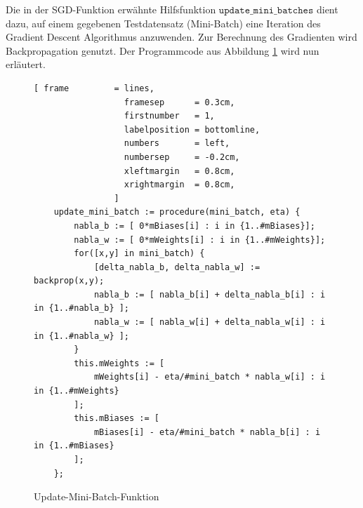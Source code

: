 \noindent
Die in der SGD-Funktion erwähnte Hilfsfunktion $\mathtt{update\_mini\_batches}$ dient dazu, auf einem gegebenen Testdatensatz (Mini-Batch) eine Iteration des Gradient Descent Algorithmus anzuwenden. Zur Berechnung des Gradienten wird Backpropagation genutzt. Der Programmcode aus Abbildung \ref{fig:update_mini_batch} wird nun erläutert.
\begin{figure}
\begin{Verbatim}[ frame         = lines, 
                  framesep      = 0.3cm, 
                  firstnumber   = 1,
                  labelposition = bottomline,
                  numbers       = left,
                  numbersep     = -0.2cm,
                  xleftmargin   = 0.8cm,
                  xrightmargin  = 0.8cm,
                ]
    update_mini_batch := procedure(mini_batch, eta) {
        nabla_b := [ 0*mBiases[i] : i in {1..#mBiases}];
        nabla_w := [ 0*mWeights[i] : i in {1..#mWeights}];
        for([x,y] in mini_batch) {
            [delta_nabla_b, delta_nabla_w] := backprop(x,y);
            nabla_b := [ nabla_b[i] + delta_nabla_b[i] : i in {1..#nabla_b} ];
            nabla_w := [ nabla_w[i] + delta_nabla_w[i] : i in {1..#nabla_w} ];
        }
        this.mWeights := [ 
            mWeights[i] - eta/#mini_batch * nabla_w[i] : i in {1..#mWeights} 
        ];
        this.mBiases := [ 
            mBiases[i] - eta/#mini_batch * nabla_b[i] : i in {1..#mBiases} 
        ];
    };
\end{Verbatim}
\vspace*{-0.3cm}
\caption{Update-Mini-Batch-Funktion}
\label{fig:update_mini_batch}
\end{figure}
